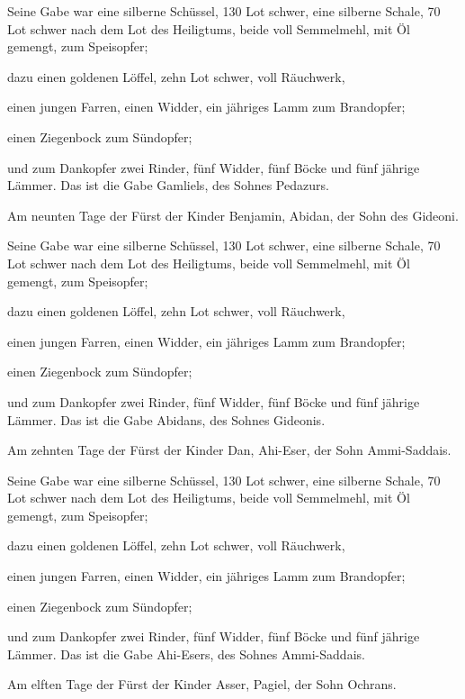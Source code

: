  Seine Gabe war eine silberne Schüssel, 130 Lot schwer,
eine silberne Schale, 70 Lot schwer nach dem Lot des Heiligtums, beide
voll Semmelmehl, mit Öl gemengt, zum Speisopfer;

 dazu einen goldenen Löffel, zehn Lot schwer, voll
Räuchwerk,

 einen jungen Farren, einen Widder, ein jähriges Lamm zum
Brandopfer;

 einen Ziegenbock zum Sündopfer;

 und zum Dankopfer zwei Rinder, fünf Widder, fünf Böcke und
fünf jährige Lämmer. Das ist die Gabe Gamliels, des Sohnes Pedazurs.

 Am neunten Tage der Fürst der Kinder Benjamin, Abidan, der
Sohn des Gideoni.

 Seine Gabe war eine silberne Schüssel, 130 Lot schwer,
eine silberne Schale, 70 Lot schwer nach dem Lot des Heiligtums, beide
voll Semmelmehl, mit Öl gemengt, zum Speisopfer;

 dazu einen goldenen Löffel, zehn Lot schwer, voll
Räuchwerk,

 einen jungen Farren, einen Widder, ein jähriges Lamm zum
Brandopfer;

 einen Ziegenbock zum Sündopfer;

 und zum Dankopfer zwei Rinder, fünf Widder, fünf Böcke und
fünf jährige Lämmer. Das ist die Gabe Abidans, des Sohnes Gideonis.

 Am zehnten Tage der Fürst der Kinder Dan, Ahi-Eser, der
Sohn Ammi-Saddais.

 Seine Gabe war eine silberne Schüssel, 130 Lot schwer,
eine silberne Schale, 70 Lot schwer nach dem Lot des Heiligtums, beide
voll Semmelmehl, mit Öl gemengt, zum Speisopfer;

 dazu einen goldenen Löffel, zehn Lot schwer, voll
Räuchwerk,

 einen jungen Farren, einen Widder, ein jähriges Lamm zum
Brandopfer;

 einen Ziegenbock zum Sündopfer;

 und zum Dankopfer zwei Rinder, fünf Widder, fünf Böcke und
fünf jährige Lämmer. Das ist die Gabe Ahi-Esers, des Sohnes
Ammi-Saddais.

 Am elften Tage der Fürst der Kinder Asser, Pagiel, der
Sohn Ochrans.

